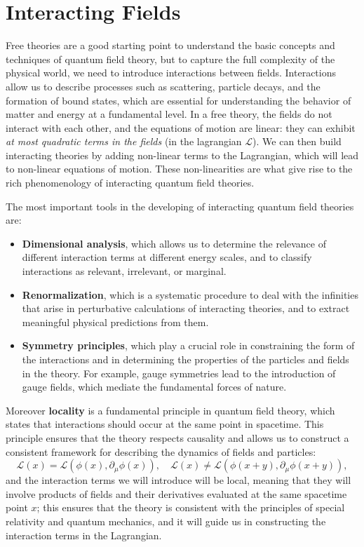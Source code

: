\chapter{Interacting Fields}

Free theories are a good starting point to understand the basic concepts and techniques of quantum field theory, but to capture the full complexity of the physical world, we need to introduce interactions between fields. Interactions allow us to describe processes such as scattering, particle decays, and the formation of bound states, which are essential for understanding the behavior of matter and energy at a fundamental level.
In a free theory, the fields do not interact with each other, and the equations of motion are linear: they can exhibit \textit{at most quadratic terms in the fields} (in the lagrangian \(\mathcal{L}\)). We can then build interacting theories by adding non-linear terms to the Lagrangian, which will lead to non-linear equations of motion. These non-linearities are what give rise to the rich phenomenology of interacting quantum field theories.

The most important tools in the developing of interacting quantum field theories are:
\begin{itemize}
    \item \textbf{Dimensional analysis}, which allows us to determine the relevance of different interaction terms at different energy scales, and to classify interactions as relevant, irrelevant, or marginal.
    \item \textbf{Renormalization}, which is a systematic procedure to deal with the infinities that arise in perturbative calculations of interacting theories, and to extract meaningful physical predictions from them.
    \item \textbf{Symmetry principles}, which play a crucial role in constraining the form of the interactions and in determining the properties of the particles and fields in the theory. For example, gauge symmetries lead to the introduction of gauge fields, which mediate the fundamental forces of nature.
\end{itemize}

Moreover \textbf{locality} is a fundamental principle in quantum field theory, which states that interactions should occur at the same point in spacetime. This principle ensures that the theory respects causality and allows us to construct a consistent framework for describing the dynamics of fields and particles:
\[
    \mathcal{L}(x) = \mathcal{L} \left( \phi(x), \partial_\mu \phi(x) \right), \quad \mathcal{L}(x) \neq \mathcal{L} \left( \phi(x+y), \partial_\mu \phi(x+y) \right),
\]
and the interaction terms we will introduce will be local, meaning that they will involve products of fields and their derivatives evaluated at the same spacetime point \(x\); this ensures that the theory is consistent with the principles of special relativity and quantum mechanics, and it will guide us in constructing the interaction terms in the Lagrangian.

